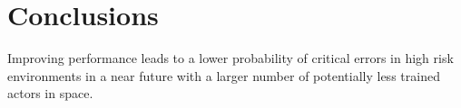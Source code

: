 \documentclass[float=false, crop=false]{standalone}
\begin{document}
\section{Conclusions}
Improving performance leads to a lower probability of critical errors in high risk environments in a near future with a larger number of potentially less trained actors in space.
\end{document}
